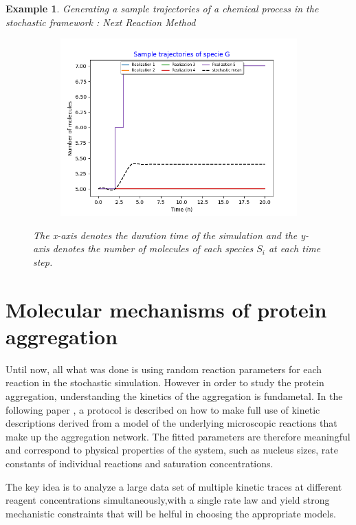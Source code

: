 \documentclass[11pt,a4paper]{article}
\newtheorem{example}[theorem]{Example}
\begin{document}
\begin{example}{Generating a sample trajectories of a chemical process in the stochastic framework : Next Reaction Method}
\begin{figure}[H]
\begin{subfigure}{.5\textwidth}
        \includegraphics[width=1.1\linewidth]{Images/g.png}
        \label{fig: Single sample trajectory}
    \end{subfigure}%
    \caption{The x-axis denotes the duration time of the simulation and the y-axis denotes the number of molecules of each species $S_{i}$ at each time step.}
    \end{figure}
\end{example}

\section {Molecular mechanisms of protein aggregation}
Until now, all what was done is using random reaction parameters for each reaction in the stochastic simulation. However in order to study the protein aggregation, understanding the kinetics of the aggregation is fundametal. In the following paper \cite{meisl_molecular_2016}, a protocol is described on how to make full use of kinetic descriptions derived from a model of the underlying microscopic reactions that make up the aggregation network. The fitted parameters are therefore meaningful and correspond to physical properties of the system, such as nucleus sizes, rate constants of individual reactions and saturation concentrations.

The key idea is to analyze a large data set of multiple kinetic traces at different reagent concentrations simultaneously,with a single rate law and yield strong mechanistic constraints that will be helful in choosing the appropriate models.
\end{document}
